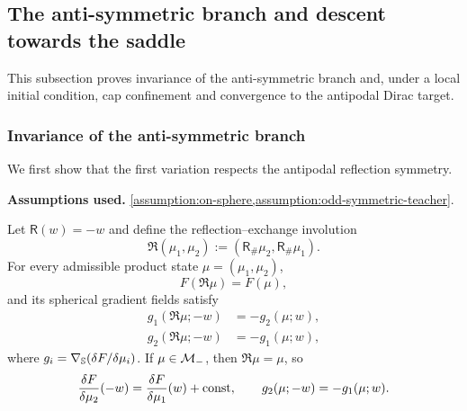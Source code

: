 
\subsection{The anti-symmetric branch and descent towards the saddle}
\label{subsec:antisymmetric-branch-and-dissipation}

This subsection proves invariance of the anti-symmetric branch and, under a local initial condition, cap confinement and convergence to the antipodal Dirac target.

\subsubsection{Invariance of the anti-symmetric branch}
\label{subsubsec:invariance}

We first show that the first variation respects the antipodal reflection symmetry.

\begin{lemma}
\label{lem:gradient-symmetry-antisymmetric-branch}
\textbf{Assumptions used.} \cref{assumption:on-sphere,assumption:odd-symmetric-teacher}.

Let \(\mathsf R(w)=-w\) and define the reflection--exchange involution
\[
 \mathfrak R(\mu_1,\mu_2)
 :=(\mathsf R_\#\mu_2,\mathsf R_\#\mu_1).
\]
For every admissible product state \(\mu=(\mu_1,\mu_2)\),
\begin{equation}
\label{eq:mf-reflection-swap-objective}
 F(\mathfrak R\mu)=F(\mu),
\end{equation}
and its spherical gradient fields satisfy
\begin{equation}
\label{eq:mf-reflection-swap-gradient}
\begin{aligned}
 g_1(\mathfrak R\mu;-w)&=-g_2(\mu;w),\\
 g_2(\mathfrak R\mu;-w)&=-g_1(\mu;w),
\end{aligned}
\end{equation}
where \(g_i=\nabla_{\mathbb{S}}(\delta F/\delta\mu_i)\).
If \(\mu\in\mathcal{M}_{-}\), then \(\mathfrak R\mu=\mu\), so
\begin{equation}
\label{eq:full-first-variation-reflection-covariance}
 \frac{\delta F}{\delta \mu_2}(-w)=\frac{\delta F}{\delta \mu_1}(w)+\mathrm{const},
 \qquad g_2(\mu;-w)=-g_1(\mu;w).
\end{equation}
\end{lemma}

